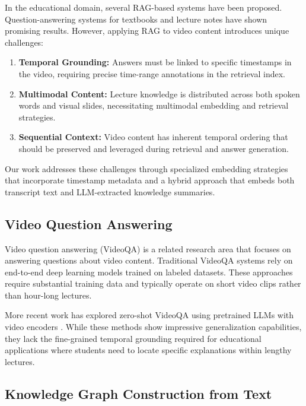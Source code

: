 \documentclass[12pt,a4paper]{article}
\begin{document}
In the educational domain, several RAG-based systems have been proposed. Question-answering systems for textbooks \cite{lee2021textbook} and lecture notes \cite{wang2022lecture} have shown promising results. However, applying RAG to video content introduces unique challenges:

\begin{enumerate}
    \item \textbf{Temporal Grounding:} Answers must be linked to specific timestamps in the video, requiring precise time-range annotations in the retrieval index.
    \item \textbf{Multimodal Content:} Lecture knowledge is distributed across both spoken words and visual slides, necessitating multimodal embedding and retrieval strategies.
    \item \textbf{Sequential Context:} Video content has inherent temporal ordering that should be preserved and leveraged during retrieval and answer generation.
\end{enumerate}

Our work addresses these challenges through specialized embedding strategies that incorporate timestamp metadata and a hybrid approach that embeds both transcript text and LLM-extracted knowledge summaries.

\subsection{Video Question Answering}

Video question answering (VideoQA) is a related research area that focuses on answering questions about video content. Traditional VideoQA systems \cite{xu2017video} rely on end-to-end deep learning models trained on labeled datasets. These approaches require substantial training data and typically operate on short video clips rather than hour-long lectures.

More recent work has explored zero-shot VideoQA using pretrained LLMs with video encoders \cite{li2023zero}. While these methods show impressive generalization capabilities, they lack the fine-grained temporal grounding required for educational applications where students need to locate specific explanations within lengthy lectures.

\subsection{Knowledge Graph Construction from Text}
\end{document}
